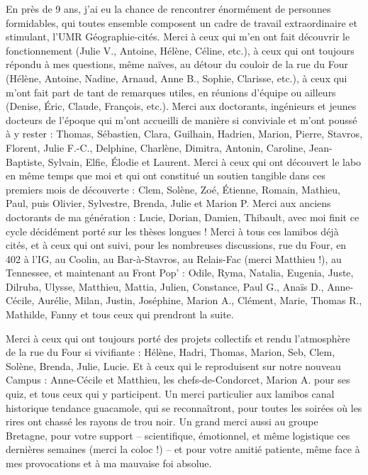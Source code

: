 En près de 9 ans, j'ai eu la chance de rencontrer énormément de personnes formidables, qui toutes ensemble composent un cadre de travail extraordinaire et stimulant, l'UMR Géographie-cités.
Merci à ceux qui m'en ont fait découvrir le fonctionnement (Julie V., Antoine, Hélène, Céline, etc.), à ceux qui ont toujours répondu à mes questions, même naïves, au détour du couloir de la rue du Four (Hélène, Antoine, Nadine, Arnaud, Anne B., Sophie, Clarisse, etc.), à ceux qui m'ont fait part de tant de remarques utiles, en réunions d'équipe ou ailleurs (Denise, Éric, Claude, François, etc.).
Merci aux doctorants, ingénieurs et jeunes docteurs de l'époque qui m'ont accueilli de manière si conviviale et m'ont poussé à y rester : Thomas, Sébastien, Clara, Guilhain, Hadrien, Marion, Pierre, Stavros, Florent, Julie F.-C., Delphine, Charlène, Dimitra, Antonin, Caroline, Jean-Baptiste, Sylvain, Elfie, Élodie et Laurent.
Merci à ceux qui ont découvert le labo en même temps que moi et qui ont constitué un soutien tangible dans ces premiers mois de découverte : Clem, Solène, Zoé, Étienne, Romain, Mathieu, Paul, puis Olivier, Sylvestre, Brenda, Julie et Marion P.
Merci aux anciens doctorants de \og ma génération\fg{} : Lucie, Dorian, Damien, Thibault, avec moi finit ce cycle décidément porté sur les thèses longues !
Merci à tous ces lamibos déjà cités, et à ceux qui ont suivi, pour les nombreuses discussions, rue du Four, en 402 à l'IG, au Coolin, au Bar-à-Stavros, au Relais-Fac (merci Matthieu !), au Tennessee, et maintenant au Front Pop' : Odile, Ryma, Natalia, Eugenia, Juste, Dilruba, Ulysse, Matthieu, Mattia, Julien, Constance, Paul G., Anaïs D., Anne-Cécile, Aurélie, Milan, Justin, Joséphine, Marion A., Clément, Marie, Thomas R., Mathilde, Fanny et tous ceux qui prendront la suite.

Merci à ceux qui ont toujours porté des projets collectifs et rendu l'atmosphère de la rue du Four si vivifiante : Hélène, Hadri, Thomas, Marion, Seb, Clem, Solène, Brenda, Julie, Lucie.
Et à ceux qui le reproduisent sur notre nouveau Campus : Anne-Cécile et Matthieu, les \og chefs-de-Condorcet\fg{}, Marion A. pour ses quiz, et tous ceux qui y participent.
Un merci particulier aux lamibos canal historique tendance guacamole, qui se reconnaîtront, pour toutes les soirées où les rires ont chassé les \og rayons de trou noir\fg{}.
Un grand merci aussi au groupe Bretagne, pour votre support -- scientifique, émotionnel, et même logistique ces dernières semaines (merci la coloc !) -- et pour votre amitié patiente, même face à mes provocations et à ma mauvaise foi absolue.
\clearpage

